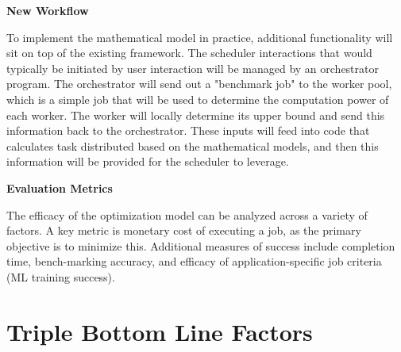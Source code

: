 \documentclass[../mthe-493-project-proposal.tex]{subfiles}
\begin{document}
    \textbf{New Workflow}
    
    To implement the mathematical model in practice, additional functionality will sit on top of the existing framework. The scheduler interactions that would typically be initiated by user interaction will be managed by an orchestrator program. The orchestrator will send out a "benchmark job" to the worker pool, which is a simple job that will be used to determine the computation power of each worker. The worker will locally determine its upper bound and send this information back to the orchestrator. These inputs will feed into code that calculates task distributed based on the mathematical models, and then this information will be provided for the scheduler to leverage.
    
    \textbf{Evaluation Metrics}
    
    The efficacy of the optimization model can be analyzed across a variety of factors. A key metric is monetary cost of executing a job, as the primary objective is to minimize this. Additional measures of success include completion time, bench-marking accuracy, and efficacy of application-specific job criteria (ML training success). 

    \section{Triple Bottom Line Factors}
    \blindtext
\end{document}
